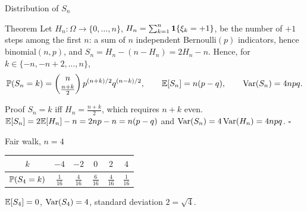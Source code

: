\begin{frame}{Distribution of $S_n$}
  \label{fr:distSn}
  \small
  \begin{block}{Theorem}
    Let $H_n\colon\Omega\to\{0,\dots,n\}$, $H_n=\sum_{k=1}^n\mathbf{1}\{\xi_k=+1\}$, be the number of $+1$ steps among the first $n$: a sum of $n$ independent Bernoulli$(p)$ indicators, hence binomial$(n,p)$, and $S_n=H_n-(n-H_n)=2H_n-n$. Hence, for $k\in\{-n,-n+2,\dots,n\}$,
    \[
      \mathbb{P}(S_n=k)=\binom{n}{\tfrac{n+k}{2}}\,p^{(n+k)/2}q^{(n-k)/2},
      \qquad
      \mathbb{E}[S_n]=n(p-q),\qquad \operatorname{Var}(S_n)=4npq .
    \]
  \end{block}
  \begin{block}{Proof}
    $S_n=k$ iff $H_n=\tfrac{n+k}2$, which requires $n+k$ even. $\mathbb{E}[S_n]=2\mathbb{E}[H_n]-n=2np-n=n(p-q)$ and $\operatorname{Var}(S_n)=4\operatorname{Var}(H_n)=4npq$. \hfill$\square$
  \end{block}
  \begin{exampleblock}{Fair walk, $n=4$}
    \begin{tabular}{@{}c|ccccc@{}}
      $k$ & $-4$ & $-2$ & $0$ & $2$ & $4$ \\ \hline
      $\mathbb{P}(S_4=k)$ & $\tfrac1{16}$ & $\tfrac4{16}$ & $\tfrac6{16}$ & $\tfrac4{16}$ & $\tfrac1{16}$
    \end{tabular}
    \qquad $\mathbb{E}[S_4]=0$, $\operatorname{Var}(S_4)=4$, standard deviation $2=\sqrt4$.
  \end{exampleblock}
\end{frame}

